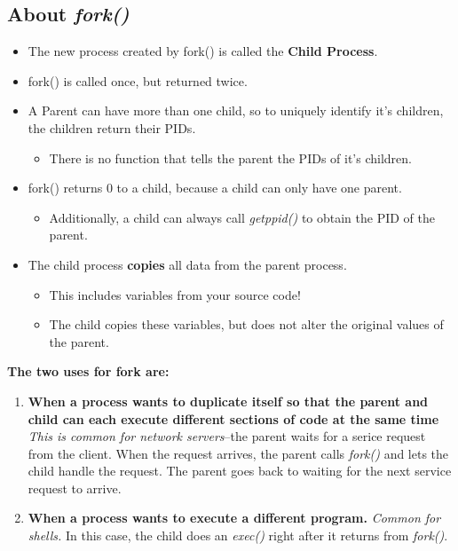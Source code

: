 \documentclass{article}
\newcommand\be[1]{\textbf{\emph{#1}}}
\begin{document}
\subsection{About \be{fork()}}
\begin{itemize}
    \item The new process created by fork() is called the \textbf{Child Process}.
    \item fork() is called once, but returned twice.
    \newline
    \item A Parent can have more than one child, so to uniquely identify it's children, the children return their PIDs.
        \begin{itemize} 
            \item{There is no function that tells the parent the PIDs of it's children.}
        \end{itemize}
    \item fork() returns 0 to a child, because a child can only have one parent.
        \begin{itemize} 
            \item{Additionally, a child can always call \emph{getppid()} to obtain the PID of the parent.}
        \end{itemize}

    \item The child process \textbf{copies} all data from the parent process.
        \begin{itemize} 
            \item{This includes variables from your source code!}
            \item{The child copies these variables, but does not alter the original values of the parent.} \newline
        \end{itemize}
\end{itemize}

\textbf{The two uses for fork are:}
\begin{enumerate}
    \item \textbf{When a process wants to duplicate itself so that the parent 
        and child can each execute different sections of code at the same time}
        \emph{This is common for network servers}--the parent waits for
        a serice request from the client. When the request arrives,
        the parent calls \emph{fork()} and lets the child handle the request.
        The parent goes back to waiting for the next service request to arrive.
    \item \textbf{When a process wants to execute a different program.}
        \emph{Common for shells.} In this case, the child does an \emph{exec()}
        right after it returns from \emph{fork()}.
\end{enumerate}
\end{document}
